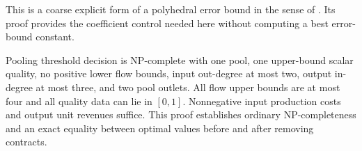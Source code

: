 This is a coarse explicit form of a polyhedral error bound in the sense
of \citet[Section~2]{s3:hoffman1952}. Its proof provides the coefficient
control needed here without computing a best error-bound constant.

\begin{theorem}\label{s3:upper-only}
Pooling threshold decision is NP-complete with one pool, one upper-bound
scalar quality, no positive lower flow bounds, input out-degree at most
two, output in-degree at most three, and two pool outlets. All flow
upper bounds are at most four and all quality data can lie in $[0,1]$.
Nonnegative input production costs and output unit revenues suffice.
This proof establishes ordinary NP-completeness and an exact equality
between optimal values before and after removing contracts.
\end{theorem}
